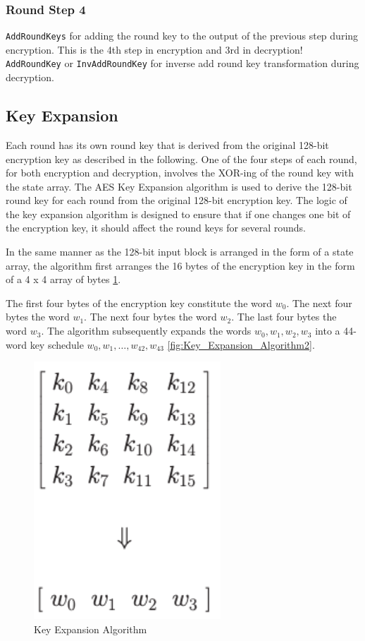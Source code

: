 \subsubsection{Round Step 4}

\texttt{AddRoundKeys} for adding the round key to the output of the previous step during encryption. This is the 4th step in encryption and 3rd in decryption! \texttt{AddRoundKey} or \texttt{InvAddRoundKey} for inverse add round key transformation during decryption. 


\subsection{Key Expansion}

Each round has its own round key that is derived from the original 128-bit encryption key as described in the following. One of the four steps of each round, for both encryption and decryption, involves the XOR-ing of the round key with the state array. The AES Key Expansion algorithm is used to derive the 128-bit round key for each round from the original 128-bit encryption key. The logic of the key expansion algorithm is designed to ensure that if one changes one bit of the encryption key, it should affect the round keys for several rounds.

In the same manner as the 128-bit input block is arranged in the form of a state array, the algorithm first arranges the 16 bytes of the encryption key in the form of a 4 x 4 array of bytes \ref{fig:Key_Expansion_Algorithm1}. 

The first four bytes of the encryption key constitute the word $w_0$. The next four bytes the word $w_1$. The next four bytes the word $w_2$. The last four bytes the word $w_3$. The algorithm subsequently expands the words $w_0,w_1,w_2,w_3$ into a 44-word key schedule $w_0,w_1,\ldots,w_{42},w_{43}$ \ref{fig:Key_Expansion_Algorithm2}.

\begin{figure}
	\centering
	\includegraphics[width=0.4\linewidth]{Images/Chapter3/Key_Expansion_Algorithm1}
	\caption{Key Expansion Algorithm}
	\label{fig:Key_Expansion_Algorithm1}
\end{figure}

